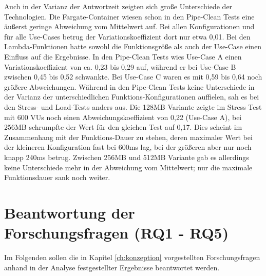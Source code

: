 Auch in der Varianz der Antwortzeit zeigten sich große Unterschiede der Technologien. Die Fargate-Container wiesen schon in den Pipe-Clean Tests eine äußerst geringe Abweichung vom Mittelwert auf. Bei allen Konfigurationen und für alle Use-Cases betrug der Variationskoeffizient dort nur etwa 0,01. Bei den Lambda-Funktionen hatte sowohl die Funktionsgröße als auch der Use-Case einen Einfluss auf die Ergebnisse. In den Pipe-Clean Tests wies Use-Case A einen Variationskoeffizient von ca. 0,23 bis 0,29 auf, während er bei Use-Case B zwischen 0,45 bis 0,52 schwankte. Bei Use-Case C waren es mit 0,59 bis 0,64 noch größere Abweichungen. Während in den Pipe-Clean Tests keine Unterschiede in der Varianz der unterschiedlichen Funktions-Konfigurationen auffielen, sah es bei den Stress- und Load-Tests anders aus. Die 128MB Variante zeigte im Stress Test mit 600 VUs noch einen Abweichungskoeffizient von 0,22 (Use-Case A), bei 256MB schrumpfte der Wert für den gleichen Test auf 0,17. Dies scheint im Zusammenhang mit der Funktions-Dauer zu stehen, deren maximaler Wert bei der kleineren Konfiguration fast bei 600ms lag, bei der größeren aber nur noch knapp 240ms betrug. Zwischen 256MB und 512MB Variante gab es allerdings keine Unterschiede mehr in der Abweichung vom Mittelwert; nur die maximale Funktionsdauer sank noch weiter. 

\section{Beantwortung der Forschungsfragen (RQ1 - RQ5)}
Im Folgenden sollen die in Kapitel \ref{ch:konzeption} vorgestellten Forschungsfragen anhand in der Analyse festgestellter Ergebnisse beantwortet werden.

